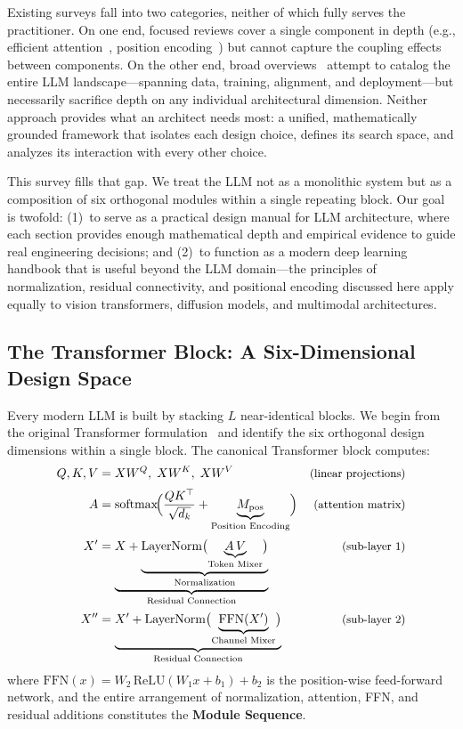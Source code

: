 \documentclass[11pt, a4paper]{article}
\begin{document}
Existing surveys fall into two categories, neither of which fully serves the practitioner.
On one end, focused reviews cover a single component in depth (e.g., efficient attention~\cite{tay2020efficient}, position encoding~\cite{sajun2024historical}) but cannot capture the coupling effects between components.
On the other end, broad overviews~\cite{shao2024survey, raiaan2024review, kim2025survey} attempt to catalog the entire LLM landscape---spanning data, training, alignment, and deployment---but necessarily sacrifice depth on any individual architectural dimension.
Neither approach provides what an architect needs most: a unified, mathematically grounded framework that isolates each design choice, defines its search space, and analyzes its interaction with every other choice.

This survey fills that gap.
We treat the LLM not as a monolithic system but as a composition of six orthogonal modules within a single repeating block.
Our goal is twofold: (1)~to serve as a practical design manual for LLM architecture, where each section provides enough mathematical depth and empirical evidence to guide real engineering decisions; and (2)~to function as a modern deep learning handbook that is useful beyond the LLM domain---the principles of normalization, residual connectivity, and positional encoding discussed here apply equally to vision transformers, diffusion models, and multimodal architectures.

\subsection*{The Transformer Block: A Six-Dimensional Design Space}

Every modern LLM is built by stacking $L$ near-identical blocks.
We begin from the original Transformer formulation~\cite{vaswani2017attention} and identify the six orthogonal design dimensions within a single block.
The canonical Transformer block computes:
\begin{align}
\label{eq:transformer_block}
Q, K, V &= X W^Q,\; X W^K,\; X W^V
  & \text{\small (linear projections)} \notag \\[2pt]
A &= \mathrm{softmax}\!\Bigl(\frac{Q K^\top}{\sqrt{d_k}} + \underbrace{M_{\mathrm{pos}}}_{\text{Position Encoding}}\Bigr)
  & \text{\small (attention matrix)} \\[2pt]
X' &= \underbrace{X + \underbrace{\mathrm{LayerNorm}\bigl(\underbrace{A \, V}_{\text{Token Mixer}}\bigr)}_{\text{Normalization}}}_{\text{Residual Connection}}
  & \text{\small (sub-layer 1)} \notag \\[2pt]
X'' &= \underbrace{X' + \mathrm{LayerNorm}\bigl(\underbrace{\mathrm{FFN}(X')}_{\text{Channel Mixer}}\bigr)}_{\text{Residual Connection}}
  & \text{\small (sub-layer 2)} \notag
\end{align}
where $\mathrm{FFN}(x) = W_2 \,\mathrm{ReLU}(W_1 x + b_1) + b_2$ is the position-wise feed-forward network, and the entire arrangement of normalization, attention, FFN, and residual additions constitutes the \textbf{Module Sequence}.
\end{document}
